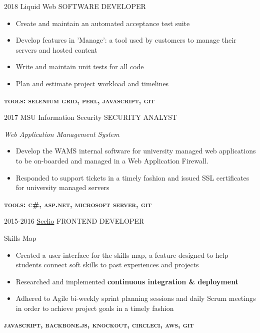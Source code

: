 \documentclass[]{friggeri-cv}
\begin{document}
\begin{entrylist}
\entry
  {2018}
  {\textcolor{gray}{\FA \faTint} Liquid Web}
  {SOFTWARE DEVELOPER}
  {
    \textit{}
    \begin{itemize}[topsep=0pt,leftmargin=0pt,itemsep=6pt]
      \item Create and maintain an automated acceptance test suite
      \item Develop features in 'Manage': a tool used by customers to manage their servers and hosted content
      \item Write and maintain unit tests for all code
      \item Plan and estimate project workload and timelines
    \end{itemize}
    \textbf{\textsc{tools: selenium grid, perl, javascript, git}}
    \vspace{10pt}
  }
\entry
  {2017}
  {\textcolor{gray}{\FA \faLock} MSU Information Security}
  {SECURITY ANALYST}
  {
    \textit{Web Application Management System}
    \begin{itemize}[topsep=0pt,leftmargin=0pt,itemsep=6pt]
      \item Develop the WAMS internal software for university managed web applications to be 
        on-boarded and managed in a Web Application Firewall.
      \item Responded to support tickets in a timely fashion and issued SSL 
        certificates for university managed servers 
    \end{itemize}
    \textbf{\textsc{tools: c\#, asp.net, microsoft server, git}}
    \vspace{10pt}
  }
\entry
  {2015-2016}
  {\textcolor{gray}{\FA \faMapMarker} \href{http://www.seelio.com/}{Seelio} }
  {FRONTEND DEVELOPER}
  {
    Skills Map
    \begin{itemize}[topsep=0pt,leftmargin=0pt,itemsep=6pt]
      \item Created a user-interface for the skills map, a feature designed
        to help students connect soft skills to past experiences and projects
      \item {
          Researched and implemented {\bfseries continuous integration \& deployment} %
        }
      \item Adhered to Agile bi-weekly sprint planning sessions and daily 
        Scrum meetings in order to achieve project goals in a timely fashion
    \end{itemize}
    \textbf{\textsc{javascript, backbone.js, knockout, circleci, aws, git}}
    \vspace{10pt}
  }


\end{entrylist}
\end{document}
